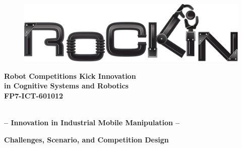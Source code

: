 
\thispagestyle{empty}


\begin{figure}
	\centering
	\includegraphics[scale=0.32]{./fig/logos/rockinLogo.pdf}
\end{figure}

\begin{center}
	\textbf{\large 
 		Robot Competitions Kick Innovation\\
 		in Cognitive Systems and Robotics\\
 		FP7-ICT-601012\\
	}

	\vspace*{10mm}
	\hrulefill
	\vspace*{5mm}

	\textbf{%
		{\Huge \roaw}\\[1.5ex]
		{\Large -- Innovation in Industrial Mobile Manipulation --}\\[1ex]
	}

	\hrulefill
	\vspace*{10mm}
\end{center}

\noindent\textbf{%
		{\Large {} Challenges, Scenario, and Competition Design}\\[1ex]
}

